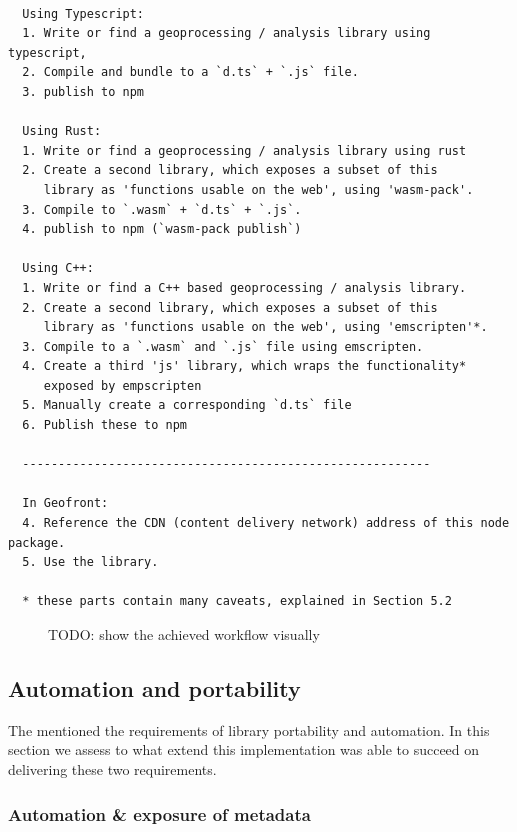 \begin{lstlisting}
  
  Using Typescript: 
  1. Write or find a geoprocessing / analysis library using typescript, 
  2. Compile and bundle to a `d.ts` + `.js` file.
  3. publish to npm 

  Using Rust: 
  1. Write or find a geoprocessing / analysis library using rust
  2. Create a second library, which exposes a subset of this 
     library as 'functions usable on the web', using 'wasm-pack'.
  3. Compile to `.wasm` + `d.ts` + `.js`.
  4. publish to npm (`wasm-pack publish`)
  
  Using C++: 
  1. Write or find a C++ based geoprocessing / analysis library. 
  2. Create a second library, which exposes a subset of this 
     library as 'functions usable on the web', using 'emscripten'*.
  3. Compile to a `.wasm` and `.js` file using emscripten.
  4. Create a third 'js' library, which wraps the functionality* 
     exposed by empscripten
  5. Manually create a corresponding `d.ts` file
  6. Publish these to npm 

  ---------------------------------------------------------

  In Geofront: 
  4. Reference the CDN (content delivery network) address of this node package. 
  5. Use the library.

  * these parts contain many caveats, explained in Section 5.2

\end{lstlisting}

\begin{figure}
  \centering
  \graphicspath{ {../../assets/diagrams/} }
  \caption[]{TODO: show the achieved workflow visually}
  \label{fig:todo-more-images}
\end{figure}

\subsection{Automation and portability}

The  mentioned the requirements of library portability and automation. 
In this section we assess to what extend this implementation was able to succeed on delivering these two requirements. 

\subsubsection*{Automation \& exposure of metadata}

